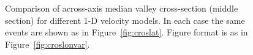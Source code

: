 \documentclass[aguplus]{aguplus}
\renewcommand{\includefig}[2]{}
\begin{document}
\begin{figure}

\includefig{cros/cros-2-jhd-mva-obh10}{30pc} %

\includefig{cros/cros-2-jhd-pro109kmvel}{30pc} %

\includefig{cros/cros-2-inv-mva-obh10}{30pc} %

\caption{Comparison of across-axis median valley cross-section (middle
section) for different 1-D velocity
models.  In each case the same events are shown as in
Figure~\ref{fig:croslat}.  Figure format is as in Figure~\ref{fig:croslonvar}.}
\label{fig:croslatvar}
\end{figure}
\end{document}

